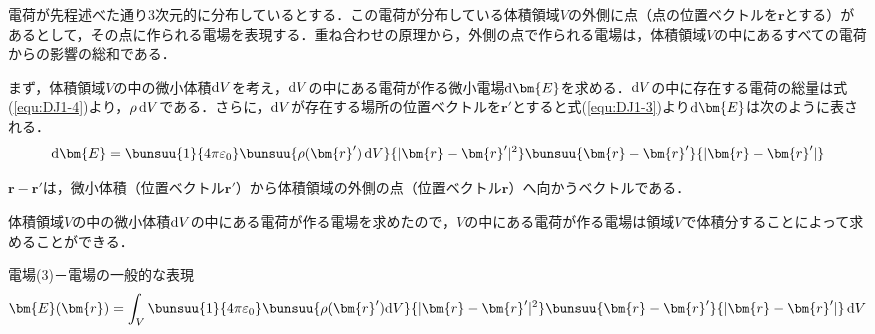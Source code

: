 電荷が先程述べた通り3次元的に分布しているとする．この電荷が分布している体積領域$V$の外側に点（点の位置ベクトルを$\bm{r}$とする）があるとして，その点に作られる電場を表現する．重ね合わせの原理から，外側の点で作られる電場は，体積領域$V$の中にあるすべての電荷からの影響の総和である．

まず，体積領域$V$の中の微小体積$\mathrm{d} V$を考え，$\mathrm{d} V$の中にある電荷が作る微小電場$\md\bm{E}$を求める．$\mathrm{d} V$の中に存在する電荷の総量は式(\ref{equ:DJ1-4})より，$\rho\,\mathrm{d} V$である．さらに，$\mathrm{d} V$が存在する場所の位置ベクトルを$\bm{r}'$とすると式(\ref{equ:DJ1-3})より$\md\bm{E}$は次のように表される．
\begin{equation}
	\md\bm{E} = \bunsuu{1}{4\pi\varepsilon_0}\bunsuu{\rho(\bm{r}')\,\md V}{|\bm{r} - \bm{r}'|^2}\bunsuu{\bm{r} - \bm{r}'}{|\bm{r} - \bm{r}'|}
\end{equation}

$\bm{r} - \bm{r}'$は，微小体積（位置ベクトル$\bm{r}'$）から体積領域の外側の点（位置ベクトル$\bm{r}$）へ向かうベクトルである．

体積領域$V$の中の微小体積$\mathrm{d} V$の中にある電荷が作る電場を求めたので，$V$の中にある電荷が作る電場は領域$V$で体積分することによって求めることができる．

\begin{kousiki}{電場(3)－電場の一般的な表現}
	\begin{equation}
		\bm{E}(\bm{r}) = \int_{V} \bunsuu{1}{4\pi\varepsilon_0}\bunsuu{\rho(\bm{r}')\md V}{|\bm{r} - \bm{r}'|^2}\bunsuu{\bm{r} - \bm{r}'}{|\bm{r} - \bm{r}'|}\,\md V
	\end{equation}
\end{kousiki}